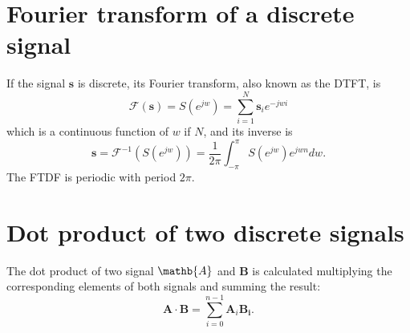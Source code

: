 \begin{subappendices}

\begin{comment}
\section{Energy Spectral Density (ESD)}

The ESD of a signal describes the distribution of the
energy\footnote{That obviously must be finite.} of the signal over
their frequency components. For a discrete-time signal $\mathbf{x}$,
the $\text{ESD}(\mathbf{x})$ is defined as
\begin{equation}
  \text{ESD}(\mathbf{x})=|\mathbf{X}|^2=\mathbf{X}\mathbf{X}^*,
\end{equation}
where $\mathbf{X}$ the DFT of $\mathbf{x}$, and $\mathbf{X}^*$ is its
complex conjugate.

\end{comment}

\section{Fourier transform of a discrete signal}
\label{sec:FTDF}

If the signal $\mathbf{s}$ is discrete, its Fourier transform, also
known as the \gls{DTFT}, is
\begin{equation}
  \mathcal{F}(\mathbf{s}) = S(e^{jw}) = \sum_{i=1}^{N}\mathbf{s}_ie^{-jwi}
\end{equation}
which is a continuous function of $w$ if $N$, and its inverse is
\begin{equation}
  \mathbf{s} = \mathcal{F}^{-1}(S(e^{jw})) = \frac{1}{2\pi}\int_{-\pi}^{\pi}S(e^{jw})e^{jwn}dw.
\end{equation}
The \acrshort{FTDF} is periodic with period $2\pi$.


\section{Dot product of two discrete signals}
The dot product of two signal $\mathb{A}$ and $\mathbf{B}$ is
calculated multiplying the corresponding elements of both signals and
summing the result:
\begin{equation}
  \mathbf{A}\cdot\mathbf{B} = \sum_{i=0}^{n-1}\mathbf{A}_i\mathbf{B_i}.
\end{equation}

\end{subappendices}

